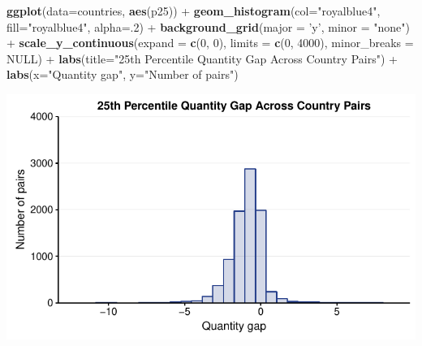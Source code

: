 \documentclass[10pt,]{article}
\newenvironment{Shaded}{\begin{snugshade}}{\end{snugshade}}
\newcommand{\KeywordTok}[1]{\textcolor[rgb]{0.13,0.29,0.53}{\textbf{{#1}}}}
\newcommand{\DataTypeTok}[1]{\textcolor[rgb]{0.13,0.29,0.53}{{#1}}}
\newcommand{\DecValTok}[1]{\textcolor[rgb]{0.00,0.00,0.81}{{#1}}}
\newcommand{\StringTok}[1]{\textcolor[rgb]{0.31,0.60,0.02}{{#1}}}
\newcommand{\OtherTok}[1]{\textcolor[rgb]{0.56,0.35,0.01}{{#1}}}
\newcommand{\NormalTok}[1]{{#1}}
\begin{document}
\begin{Shaded}
\begin{Highlighting}[]
\KeywordTok{ggplot}\NormalTok{(}\DataTypeTok{data=}\NormalTok{countries, }\KeywordTok{aes}\NormalTok{(p25)) +}
\StringTok{  }\KeywordTok{geom_histogram}\NormalTok{(}\DataTypeTok{col=}\StringTok{"royalblue4"}\NormalTok{,}
                 \DataTypeTok{fill=}\StringTok{"royalblue4"}\NormalTok{,}
                 \DataTypeTok{alpha=}\NormalTok{.}\DecValTok{2}\NormalTok{) +}
\StringTok{  }\KeywordTok{background_grid}\NormalTok{(}\DataTypeTok{major =} \StringTok{'y'}\NormalTok{, }\DataTypeTok{minor =} \StringTok{"none"}\NormalTok{) +}
\StringTok{  }\KeywordTok{scale_y_continuous}\NormalTok{(}\DataTypeTok{expand =} \KeywordTok{c}\NormalTok{(}\DecValTok{0}\NormalTok{, }\DecValTok{0}\NormalTok{), }\DataTypeTok{limits =} \KeywordTok{c}\NormalTok{(}\DecValTok{0}\NormalTok{, }\DecValTok{4000}\NormalTok{),  }\DataTypeTok{minor_breaks =} \OtherTok{NULL}\NormalTok{) +}
\StringTok{  }\KeywordTok{labs}\NormalTok{(}\DataTypeTok{title=}\StringTok{"25th Percentile Quantity Gap Across Country Pairs"}\NormalTok{) +}
\StringTok{  }\KeywordTok{labs}\NormalTok{(}\DataTypeTok{x=}\StringTok{"Quantity gap"}\NormalTok{, }\DataTypeTok{y=}\StringTok{"Number of pairs"}\NormalTok{)}
\end{Highlighting}
\end{Shaded}

\begin{center}\includegraphics{Figs/qty_summary-8} \end{center}
\end{document}
